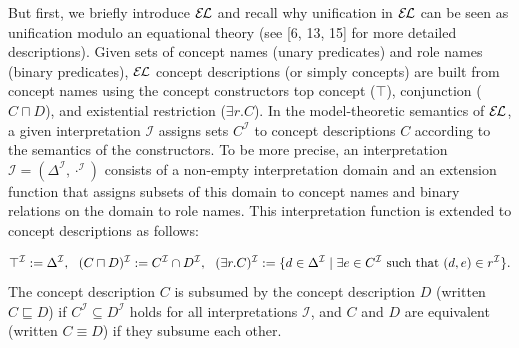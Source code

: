 \documentclass[10pt,a4paper]{amsart}
\begin{document}
 
 
But first, we briefly introduce $\mathcal{E\mkern-1.618muL}$ and recall why unification in $\mathcal{E\mkern-1.618muL}$ can be seen as unification modulo an equational theory (see [6, 13, 15] for more detailed descriptions). Given sets of concept names (unary predicates) and role names (binary predicates), $\mathcal{E\mkern-1.618muL}$ concept descriptions (or simply concepts) are built from concept names using the concept constructors top concept ($\top$), conjunction ($C\sqcap D$), and existential restriction ($\exists r.C$). In the model-theoretic semantics of $\mathcal{E\mkern-1.618muL}$, a given interpretation $\mathcal{I}$ assigns sets $C^{\mathcal{I}}$ to concept descriptions $C$ according to the semantics of the constructors. To be more precise, an interpretation $\mathcal{I}=(\Delta^{\mathcal{I}},\cdot^{\mathcal{I}})$ consists of a non-empty interpretation domain and an extension function that assigns subsets of this domain to concept names and binary relations on the domain to role names. This interpretation function is extended to concept descriptions as follows:\par
    \[\top^{\mathcal{I}}:=\Delta^{\mathcal{I}},\ \ (C\sqcap D)^{\mathcal{I}}:=C^{%
\mathcal{I}}\cap D^{\mathcal{I}},\ \ (\exists r.C)^{\mathcal{I}}:=\{d\in\Delta%
^{\mathcal{I}}\mid\exists e\in C^{\mathcal{I}}\ \mbox{such that}\ (d,e)\in r^{%
\mathcal{I}}\}.\]    
The concept description $C$ is subsumed by the concept description $D$ (written $C\sqsubseteq D$) if $C^{\mathcal{I}}\subseteq D^{\mathcal{I}}$ holds for all interpretations $\mathcal{I}$, and $C$ and $D$ are equivalent (written $C\equiv D$) if they subsume each other.\par
 
 
 
\end{document}
